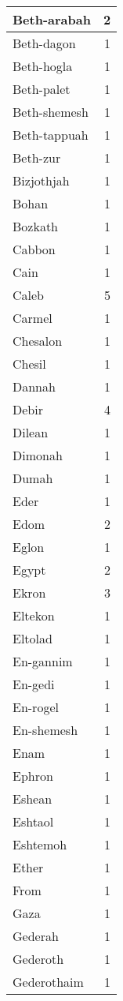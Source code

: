 \begin{center}
\begin{longtable}{l|r}
Beth-arabah & 2\\ \hline 
Beth-dagon & 1\\ \hline 
Beth-hogla & 1\\ \hline 
Beth-palet & 1\\ \hline 
Beth-shemesh & 1\\ \hline 
Beth-tappuah & 1\\ \hline 
Beth-zur & 1\\ \hline 
Bizjothjah & 1\\ \hline 
Bohan & 1\\ \hline 
Bozkath & 1\\ \hline 
Cabbon & 1\\ \hline 
Cain & 1\\ \hline 
Caleb & 5\\ \hline 
Carmel & 1\\ \hline 
Chesalon & 1\\ \hline 
Chesil & 1\\ \hline 
Dannah & 1\\ \hline 
Debir & 4\\ \hline 
Dilean & 1\\ \hline 
Dimonah & 1\\ \hline 
Dumah & 1\\ \hline 
Eder & 1\\ \hline 
Edom & 2\\ \hline 
Eglon & 1\\ \hline 
Egypt & 2\\ \hline 
Ekron & 3\\ \hline 
Eltekon & 1\\ \hline 
Eltolad & 1\\ \hline 
En-gannim & 1\\ \hline 
En-gedi & 1\\ \hline 
En-rogel & 1\\ \hline 
En-shemesh & 1\\ \hline 
Enam & 1\\ \hline 
Ephron & 1\\ \hline 
Eshean & 1\\ \hline 
Eshtaol & 1\\ \hline 
Eshtemoh & 1\\ \hline 
Ether & 1\\ \hline 
From & 1\\ \hline 
Gaza & 1\\ \hline 
Gederah & 1\\ \hline 
Gederoth & 1\\ \hline 
Gederothaim & 1\\ \hline 

\end{longtable}
\end{center}

